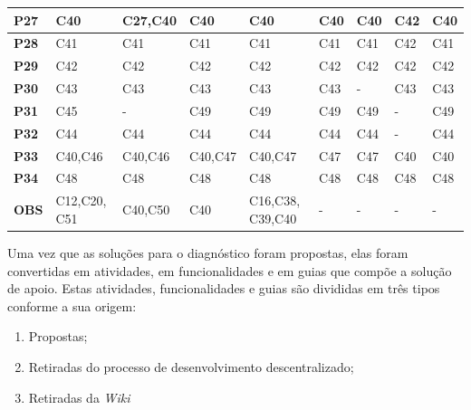 \begin{longtable}{|M{1.0cm}|M{1.5cm}|M{1.5cm}|M{1.5cm}|M{1.5cm}|M{1.5cm}|M{1.5cm}|M{1.5cm}|M{1.5cm}|}
\textbf{P27} & C40            & C27,C40        & C40            & C40             & C40            & C40            & C42            & C40            \\ \hline
\textbf{P28} & C41            & C41            & C41            & C41             & C41            & C41            & C42            & C41            \\ \hline
\textbf{P29} & C42            & C42            & C42            & C42             & C42            & C42            & C42            & C42            \\ \hline
\textbf{P30} & C43            & C43            & C43            & C43             & C43            & -              & C43            & C43            \\ \hline
\textbf{P31} & C45            & -              & C49            & C49             & C49            & C49            & -              & C49            \\ \hline
\textbf{P32} & C44            & C44            & C44            & C44             & C44            & C44            & -              & C44            \\ \hline
\textbf{P33} & C40,C46        & C40,C46        & C40,C47        & C40,C47         & C47            & C47            & C40            & C40            \\ \hline
\textbf{P34} & C48            & C48            & C48            & C48             & C48            & C48            & C48            & C48            \\ \hline
\textbf{OBS} & C12,C20, C51    & C40,C50        & C40            & C16,C38, C39,C40 & -              & -              & -              & -              \\ \hline
\end{longtable}
\clearpage

Uma vez que as soluções para o diagnóstico foram propostas, elas foram convertidas em atividades, em funcionalidades e em guias que compõe a solução de apoio. Estas atividades, funcionalidades e guias são divididas em três tipos conforme a sua origem:
\begin{enumerate}
\item Propostas;
\item Retiradas do processo de desenvolvimento descentralizado;
\item Retiradas da \textit{Wiki}
\end{enumerate}

